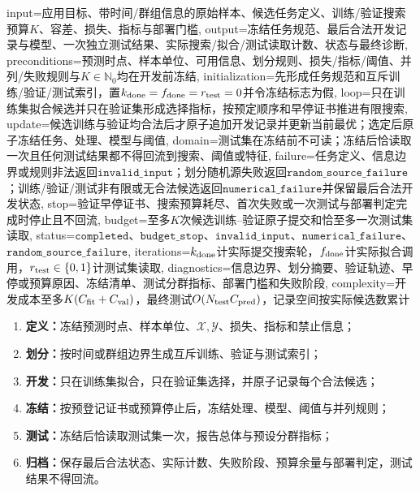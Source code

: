 \begin{AlgorithmContract}{
  input={应用目标、带时间/群组信息的原始样本、候选任务定义、训练/验证搜索预算$K$、容差、损失、指标与部署门槛},
  output={冻结任务规范、最后合法开发记录与模型、一次独立测试结果、实际搜索/拟合/测试读取计数、状态与最终诊断},
  preconditions={预测时点、样本单位、可用信息、划分规则、损失/指标/阈值、并列/失败规则与$K\in\mathbb N_0$均在开发前冻结},
  initialization={先形成任务规范和互斥训练/验证/测试索引，置$k_{\rm done}=f_{\rm done}=r_{\rm test}=0$并令冻结标志为假},
  loop={只在训练集拟合候选并只在验证集形成选择指标，按预定顺序和早停证书推进有限搜索},
  update={候选训练与验证均合法后才原子追加开发记录并更新当前最优；选定后原子冻结任务、处理、模型与阈值},
  domain={测试集在冻结前不可读；冻结后恰读取一次且任何测试结果都不得回流到搜索、阈值或特征},
  failure={任务定义、信息边界或规则非法返回$\mathtt{invalid\_input}$；划分随机源失败返回$\mathtt{random\_source\_failure}$；训练/验证/测试非有限或无合法候选返回$\mathtt{numerical\_failure}$并保留最后合法开发状态},
  stop={验证早停证书、搜索预算耗尽、首次失败或一次测试与部署判定完成时停止且不回流},
  budget={至多$K$次候选训练--验证原子提交和恰至多一次测试集读取},
  status={$\mathtt{completed}$、$\mathtt{budget\_stop}$、$\mathtt{invalid\_input}$、$\mathtt{numerical\_failure}$、$\mathtt{random\_source\_failure}$},
  iterations={$k_{\rm done}$计实际提交搜索轮，$f_{\rm done}$计实际拟合调用，$r_{\rm test}\in\{0,1\}$计测试集读取},
  diagnostics={信息边界、划分摘要、验证轨迹、早停或预算原因、冻结清单、测试分群指标、部署门槛和失败阶段},
  complexity={开发成本至多$K(C_{\rm fit}+C_{\rm val})$，最终测试$O(N_{\rm test}C_{\rm pred})$，记录空间按实际候选数累计}
}
\begin{keypointbox}[title=稳健实现说明：六阶段评估闭环（不编号为数学算法）]
\begin{enumerate}[leftmargin=2.2em,itemsep=1pt]
  \item \textbf{定义：}冻结预测时点、样本单位、$\mathcal X,\mathcal Y$、损失、指标和禁止信息；
  \item \textbf{划分：}按时间或群组边界生成互斥训练、验证与测试索引；
  \item \textbf{开发：}只在训练集拟合，只在验证集选择，并原子记录每个合法候选；
  \item \textbf{冻结：}按预登记证书或预算停止后，冻结处理、模型、阈值与并列规则；
  \item \textbf{测试：}冻结后恰读取测试集一次，报告总体与预设分群指标；
  \item \textbf{归档：}保存最后合法状态、实际计数、失败阶段、预算余量与部署判定，测试结果不得回流。
\end{enumerate}
\end{keypointbox}
\end{AlgorithmContract}

